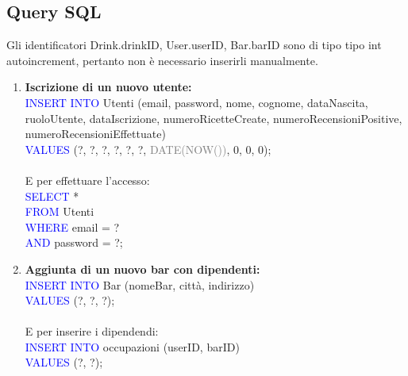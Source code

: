 \documentclass[a4paper,12pt]{report}
\begin{document}
\newpage
\subsection{Query SQL}

    Gli identificatori Drink.drinkID, User.userID, Bar.barID sono di tipo tipo int auto\textunderscore increment, pertanto non è necessario inserirli manualmente.
\begin{enumerate}
    \item \textbf{Iscrizione di un nuovo utente:}\\
        \textcolor{blue}{INSERT INTO} Utenti \footnotesize(email, password, nome, cognome, dataNascita, ruoloUtente, dataIscrizione, numeroRicetteCreate, numeroRecensioniPositive, numeroRecensioniEffettuate) \normalsize \\
        \textcolor{blue}{VALUES} (?, ?, ?, ?, ?, ?, \textcolor{gray}{DATE(NOW())}, 0, 0, 0);
        \\\\
        E per effettuare l'accesso:\\
        \textcolor{blue}{SELECT} *\\
        \textcolor{blue}{FROM} Utenti\\
        \textcolor{blue}{WHERE} email = ?\\
        \textcolor{blue}{AND} password = ?;
        
    \item \textbf{Aggiunta di un nuovo bar con dipendenti:\\}
        \textcolor{blue}{INSERT INTO} Bar (nomeBar, città, indirizzo) \\
        \textcolor{blue}{VALUES} (?, ?, ?);
        \\\\
        E per inserire i dipendendi:\\
        \textcolor{blue}{INSERT INTO} occupazioni (userID, barID)\\
        \textcolor{blue}{VALUES} (?, ?);
    

\end{enumerate}
\end{document}
